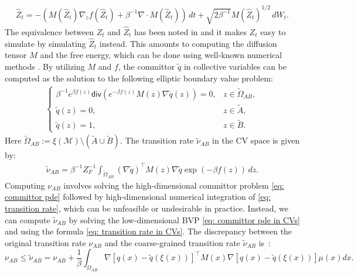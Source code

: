 \documentclass[reqno, 12pt]{article}
\begin{document}
\begin{align}
        \widehat{Z}_t = -(M(\widehat{Z}_t)\nabla_{z}f(\widehat{Z}_t) + \beta^{-1}\nabla \cdot M(\widehat{Z}_t))\,dt + \sqrt{2\beta^{-1}}M(\widehat{Z}_t)^{1/2}\,dW_t. \label{eq: free energy dynamics}
    \end{align}
The equivalence between $Z_t$ and $\widehat{Z}_t$ has been noted in \cite{legoll2010effective} and it makes $Z_t$ easy to simulate by simulating $\widehat{Z}_t$ instead. This amounts to computing the diffusion tensor $M$ and the free energy, which can be done using well-known numerical methods \cite{maragliano2006string, Muller2021, Darve2008, Parrinello2017, barducci2008well}. 
By utilizing $M$ and $f$, the committor $\tilde{q}$ in collective variables can be computed as the solution to the following elliptic boundary value problem:
\begin{align}
\begin{cases}
    \beta^{-1}e^{\beta f(z)}\textsf{div}(e^{-\beta f(z)}M(z)\nabla \tilde{q}(z)) = 0, & z \in \tilde{\Omega}_{AB}, \\
    \tilde{q}(z) = 0, & z \in \tilde{A}, \\ 
     \tilde{q}(z) = 1, & z \in \tilde{B}.
        \end{cases}\label{eq: committor pde in CVs}
\end{align}
Here $\tilde{\Omega}_{AB} := \xi(\mathcal{M}) \setminus (\tilde{A} \cup \tilde{B})$. 
The transition rate $\tilde{\nu}_{AB}$ in the CV space is given by: 
\begin{align}
    \tilde{\nu}_{AB} = \beta^{-1} Z^{-1}_{F} \int_{\tilde{\Omega}_{AB}} (\nabla \tilde{q})^{\top}M(z)\nabla \tilde{q} \exp{(-\beta f(z))}\,dz.
\label{eq: transition rate in CVs}
\end{align}
Computing $\nu_{AB}$ involves solving the high-dimensional committor problem \eqref{eq: committor pde} followed by high-dimensional numerical integration of \eqref{eq: transition rate}, which can be unfeasible or undesirable in practice. Instead, we can compute $\tilde{\nu}_{AB}$ by solving the low-dimensional BVP \eqref{eq: committor pde in CVs} and using the formula \eqref{eq: transition rate in CVs}. The discrepancy between the original transition rate $\nu_{AB}$ and the coarse-grained transition rate $\tilde{\nu}_{AB}$ is~\parencite{ZhangHartmannSchutte_2016}:
\begin{equation} 
\label{ZHS2016}
\nu_{AB} \le\tilde{\nu}_{AB}  = \nu_{AB} +\frac{1}{\beta}\int_{\Omega_{AB}}\nabla[q(x)-\tilde{q}(\xi(x))]^\top M(x)\nabla[q(x)-\tilde{q}(\xi(x))] \mu(x) dx.
\end{equation}
\end{document}
